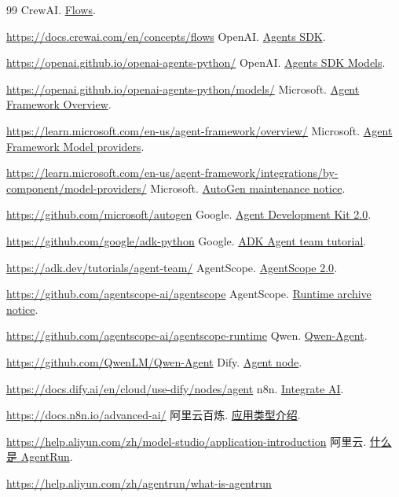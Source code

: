 \documentclass[11pt,a4paper]{article}
\begin{document}
\begin{thebibliography}{99}
 CrewAI. \href{https://docs.crewai.com/en/concepts/flows}{Flows}.\par\url{https://docs.crewai.com/en/concepts/flows}
 OpenAI. \href{https://openai.github.io/openai-agents-python/}{Agents SDK}.\par\url{https://openai.github.io/openai-agents-python/}
 OpenAI. \href{https://openai.github.io/openai-agents-python/models/}{Agents SDK Models}.\par\url{https://openai.github.io/openai-agents-python/models/}
 Microsoft. \href{https://learn.microsoft.com/en-us/agent-framework/overview/}{Agent Framework Overview}.\par\url{https://learn.microsoft.com/en-us/agent-framework/overview/}
 Microsoft. \href{https://learn.microsoft.com/en-us/agent-framework/integrations/by-component/model-providers/}{Agent Framework Model providers}.\par\url{https://learn.microsoft.com/en-us/agent-framework/integrations/by-component/model-providers/}
 Microsoft. \href{https://github.com/microsoft/autogen}{AutoGen maintenance notice}.\par\url{https://github.com/microsoft/autogen}
 Google. \href{https://github.com/google/adk-python}{Agent Development Kit 2.0}.\par\url{https://github.com/google/adk-python}
 Google. \href{https://adk.dev/tutorials/agent-team/}{ADK Agent team tutorial}.\par\url{https://adk.dev/tutorials/agent-team/}
 AgentScope. \href{https://github.com/agentscope-ai/agentscope}{AgentScope 2.0}.\par\url{https://github.com/agentscope-ai/agentscope}
 AgentScope. \href{https://github.com/agentscope-ai/agentscope-runtime}{Runtime archive notice}.\par\url{https://github.com/agentscope-ai/agentscope-runtime}
 Qwen. \href{https://github.com/QwenLM/Qwen-Agent}{Qwen-Agent}.\par\url{https://github.com/QwenLM/Qwen-Agent}
 Dify. \href{https://docs.dify.ai/en/cloud/use-dify/nodes/agent}{Agent node}.\par\url{https://docs.dify.ai/en/cloud/use-dify/nodes/agent}
 n8n. \href{https://docs.n8n.io/advanced-ai/}{Integrate AI}.\par\url{https://docs.n8n.io/advanced-ai/}
 阿里云百炼. \href{https://help.aliyun.com/zh/model-studio/application-introduction}{应用类型介绍}.\par\url{https://help.aliyun.com/zh/model-studio/application-introduction}
 阿里云. \href{https://help.aliyun.com/zh/agentrun/what-is-agentrun}{什么是 AgentRun}.\par\url{https://help.aliyun.com/zh/agentrun/what-is-agentrun}


\end{thebibliography}
\end{document}
